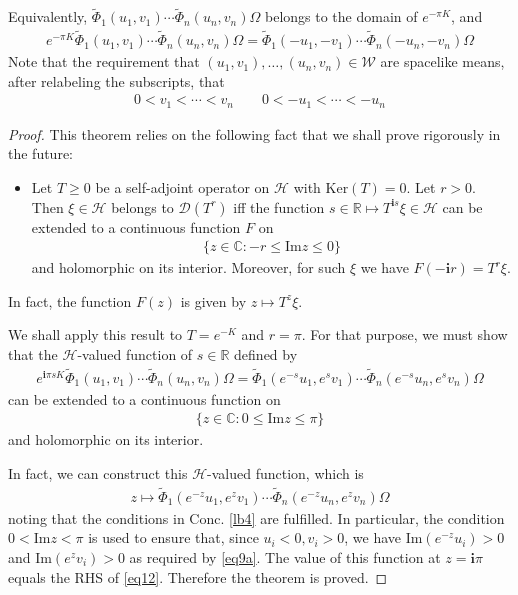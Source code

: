 \documentclass[12pt,b5paper,notitlepage]{article}
\theoremstyle{definition}
\theoremstyle{plain}
\newcommand{\mc}{\mathcal}
\newcommand{\wtd}{\widetilde}
\newcommand{\Dom}{\scr{D}}
\newcommand{\scr}{\mathscr}
\newcommand{\im}{\mathbf{i}}
\newcommand{\Cbb}{\mathbb C}
\newcommand{\Rbb}{\mathbb R}
\newcommand{\Ker}{\mathrm{Ker}}
\newcommand{\Imag}{\mathrm{Im}}
\numberwithin{equation}{section}
\begin{document}
Equivalently, $\wtd\Phi_1(u_1,v_1)\cdots\wtd\Phi_n(u_n,v_n)\Omega$ belongs to the domain of $e^{-\pi K}$, and
\begin{align}\label{eq12}
e^{-\pi K}\wtd\Phi_1(u_1,v_1)\cdots\wtd\Phi_n(u_n,v_n)\Omega=\wtd\Phi_1(-u_1,-v_1)\cdots\wtd\Phi_n(-u_n,-v_n)\Omega
\end{align}
Note that the requirement that $(u_1,v_1),\dots,(u_n,v_n)\in\mc W$ are spacelike means, after relabeling the subscripts, that
\begin{align*}
0<v_1<\cdots<v_n\qquad 0<-u_1<\cdots<-u_n
\end{align*}
\begin{proof}
This theorem relies on the following fact that we shall prove rigorously in the future:
\begin{itemize}
\item[$\varstar$] Let $T\geq0$ be a self-adjoint operator on $\mc H$ with $\Ker(T)=0$. Let $r>0$. Then $\xi\in\mc H$ belongs to $\Dom(T^r)$ iff the function $s\in\Rbb\mapsto T^{\im s}\xi\in\mc H$ can be extended to a continuous function $F$ on 
\begin{align*}
\{z\in\Cbb:-r\leq\Imag z\leq0\}
\end{align*}
and holomorphic on its interior. Moreover, for such $\xi$ we have $F(-\im r)=T^r\xi$.
\end{itemize}
In fact, the function $F(z)$ is given by $z\mapsto T^z\xi$.

We shall apply this result to $T=e^{-K}$ and $r=\pi$. For that purpose, we must show that the $\mc H$-valued function of $s\in\Rbb$ defined by
\begin{align*}
e^{\im\pi s K}\wtd\Phi_1(u_1,v_1)\cdots\wtd\Phi_n(u_n,v_n)\Omega=\wtd\Phi_1(e^{-s}u_1,e^sv_1)\cdots\wtd\Phi_n(e^{-s}u_n,e^sv_n)\Omega
\end{align*}
can be extended to a continuous function on
\begin{align*}
\{z\in\Cbb:0\leq\Imag z\leq \pi\}
\end{align*}
and holomorphic on its interior. 

In fact, we can construct this $\mc H$-valued function, which is
\begin{align*}
z\mapsto \wtd\Phi_1(e^{-z}u_1,e^zv_1)\cdots\wtd\Phi_n(e^{-z}u_n,e^zv_n)\Omega
\end{align*}
noting that the conditions in Conc. \ref{lb4} are fulfilled. In particular, the condition $0<\Imag z<\pi$ is used to ensure that, since $u_i<0,v_i>0$, we have $\Imag (e^{-z}u_i)>0$ and $\Imag(e^zv_i)>0$ as required by \eqref{eq9a}. The value of this function at $z=\im\pi$ equals the RHS of \eqref{eq12}. Therefore the theorem is proved.
\end{proof}
\end{document}
